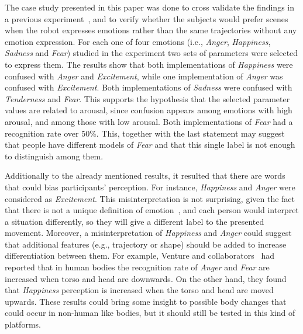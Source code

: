 The case study presented in this paper was done to cross validate the findings in a previous experiment~\cite{Angel2017-2}, and to verify whether the subjects would prefer scenes when the robot expresses emotions rather than the same trajectories without any emotion expression. For each one of four emotions (i.e., \textit{Anger}, \textit{Happiness}, \textit{Sadness} and \textit{Fear}) studied in the experiment two sets of parameters were selected to express them. The results show that both implementations of \textit{Happiness} were confused with \textit{Anger} and \textit{Excitement}, while one implementation of \textit{Anger} was confused with \textit{Excitement}. Both implementations of \textit{Sadness} were confused with \textit{Tenderness} and \textit{Fear}. This supports the hypothesis that the selected parameter values are related to arousal, since confusion appears among emotions with high arousal, and among those with low arousal. Both implementations of \textit{Fear} had a recognition rate over 50\%. This, together with the last statement may suggest that people have different models of \textit{Fear} and that this single label is not enough to distinguish among them. 

Additionally to the already mentioned results, it resulted that there are words that could bias participants' perception. For instance, \textit{Happiness} and \textit{Anger} were considered as \textit{Excitement}. This misinterpretation is not surprising, given the fact that there is not a unique definition of emotion~\cite{Plutchik2001,cacioppo2000handbook}, and each person would interpret a situation differently, so they will give a different label to the presented movement. Moreover, a misinterpretation of \textit{Happiness} and \textit{Anger} could suggest that additional features (e.g., trajectory or shape) should be added to increase differentiation between them. For example, Venture and collaborators~\cite{Venture2014} had reported that in human bodies the recognition rate of \textit{Anger} and \textit{Fear} are increased when torso and head are downwards. On the other hand, they found that \textit{Happiness} perception is increased when the torso and head are moved upwards. These results could bring some insight to possible body changes that could occur in non-human like bodies, but it should still be tested in this kind of platforms.
 
